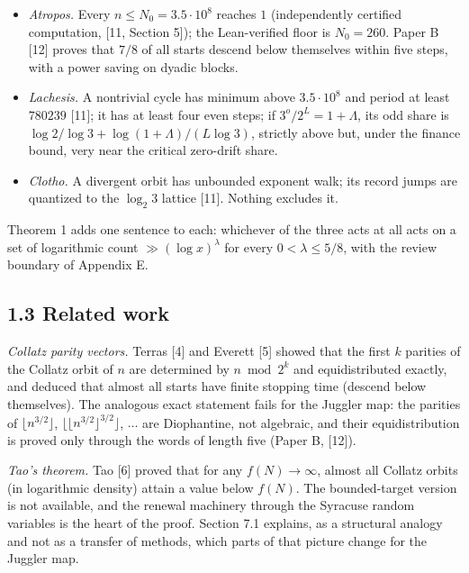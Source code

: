 \documentclass[11pt,a4paper]{article}
\providecommand{\tightlist}{\setlength{\itemsep}{0pt}\setlength{\parskip}{0pt}}
\begin{document}
\begin{itemize}
\tightlist
\item
  \emph{Atropos.} Every \(n\le N_0=3.5\cdot 10^8\) reaches \(1\)
  (independently certified computation, {[}11, Section 5{]}); the
  Lean-verified floor is \(N_0=260\). Paper B {[}12{]} proves that
  \(7/8\) of all starts descend below themselves within five steps, with
  a power saving on dyadic blocks.
\item
  \emph{Lachesis.} A nontrivial cycle has minimum above
  \(3.5\cdot 10^8\) and period at least \(780239\) {[}11{]}; it has at
  least four even steps; if \(3^o/2^L=1+\Lambda\), its odd share is
  \(\log 2/\log 3+\log(1+\Lambda)/(L\log3)\), strictly above but, under
  the finance bound, very near the critical zero-drift share.
\item
  \emph{Clotho.} A divergent orbit has unbounded exponent walk; its
  record jumps are quantized to the \(\log_2 3\) lattice {[}11{]}.
  Nothing excludes it.
\end{itemize}

Theorem 1 adds one sentence to each: whichever of the three acts at all
acts on a set of logarithmic count \(\gg(\log x)^\lambda\) for every
\(0<\lambda\le5/8\), with the review boundary of Appendix E.

\subsection{1.3 Related work}\label{related-work}

\emph{Collatz parity vectors.} Terras {[}4{]} and Everett {[}5{]} showed
that the first \(k\) parities of the Collatz orbit of \(n\) are
determined by \(n\bmod 2^k\) and equidistributed exactly, and deduced
that almost all starts have finite stopping time (descend below
themselves). The analogous exact statement fails for the Juggler map:
the parities of \(\lfloor n^{3/2}\rfloor\),
\(\lfloor\lfloor n^{3/2}\rfloor^{3/2}\rfloor\), \(\dots\) are
Diophantine, not algebraic, and their equidistribution is proved only
through the words of length five (Paper B, {[}12{]}).

\emph{Tao's theorem.} Tao {[}6{]} proved that for any \(f(N)\to\infty\),
almost all Collatz orbits (in logarithmic density) attain a value below
\(f(N)\). The bounded-target version is not available, and the renewal
machinery through the Syracuse random variables is the heart of the
proof. Section 7.1 explains, as a structural analogy and not as a
transfer of methods, which parts of that picture change for the Juggler
map.
\end{document}
